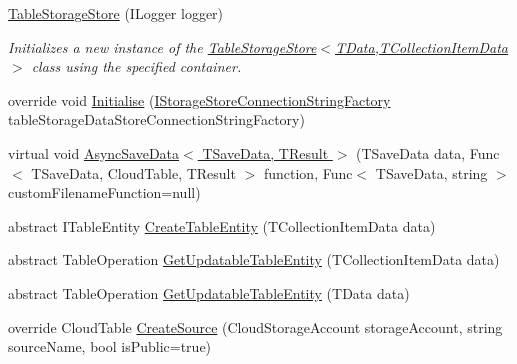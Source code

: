 \begin{DoxyCompactItemize}
\item 
\hyperlink{classCqrs_1_1Azure_1_1BlobStorage_1_1TableStorageStore_aabc36bc46ffb22b716cc7769a641cfab_aabc36bc46ffb22b716cc7769a641cfab}{Table\+Storage\+Store} (I\+Logger logger)
\begin{DoxyCompactList}\small\item\em Initializes a new instance of the \hyperlink{classCqrs_1_1Azure_1_1BlobStorage_1_1TableStorageStore_aabc36bc46ffb22b716cc7769a641cfab_aabc36bc46ffb22b716cc7769a641cfab}{Table\+Storage\+Store$<$\+T\+Data,\+T\+Collection\+Item\+Data$>$} class using the specified container. \end{DoxyCompactList}\item 
override void \hyperlink{classCqrs_1_1Azure_1_1BlobStorage_1_1TableStorageStore_ae775f039a168cc48c731314c7e494bb6_ae775f039a168cc48c731314c7e494bb6}{Initialise} (\hyperlink{interfaceCqrs_1_1Azure_1_1BlobStorage_1_1IStorageStoreConnectionStringFactory}{I\+Storage\+Store\+Connection\+String\+Factory} table\+Storage\+Data\+Store\+Connection\+String\+Factory)
\item 
virtual void \hyperlink{classCqrs_1_1Azure_1_1BlobStorage_1_1TableStorageStore_a1a1dcf73501d4e7fc23e8137627de6f7_a1a1dcf73501d4e7fc23e8137627de6f7}{Async\+Save\+Data$<$ T\+Save\+Data, T\+Result $>$} (T\+Save\+Data data, Func$<$ T\+Save\+Data, Cloud\+Table, T\+Result $>$ function, Func$<$ T\+Save\+Data, string $>$ custom\+Filename\+Function=null)
\item 
abstract I\+Table\+Entity \hyperlink{classCqrs_1_1Azure_1_1BlobStorage_1_1TableStorageStore_a168a634f7f55bd264e01bd7e0f1f9f15_a168a634f7f55bd264e01bd7e0f1f9f15}{Create\+Table\+Entity} (T\+Collection\+Item\+Data data)
\item 
abstract Table\+Operation \hyperlink{classCqrs_1_1Azure_1_1BlobStorage_1_1TableStorageStore_a1308b107766a375b7b8dcc92d9080393_a1308b107766a375b7b8dcc92d9080393}{Get\+Updatable\+Table\+Entity} (T\+Collection\+Item\+Data data)
\item 
abstract Table\+Operation \hyperlink{classCqrs_1_1Azure_1_1BlobStorage_1_1TableStorageStore_ae476c94b77d9c602aef934bd8c1b20ea_ae476c94b77d9c602aef934bd8c1b20ea}{Get\+Updatable\+Table\+Entity} (T\+Data data)
\item 
override Cloud\+Table \hyperlink{classCqrs_1_1Azure_1_1BlobStorage_1_1TableStorageStore_ad504317a3b2c07172f50b8e7b8d0f78e_ad504317a3b2c07172f50b8e7b8d0f78e}{Create\+Source} (Cloud\+Storage\+Account storage\+Account, string source\+Name, bool is\+Public=true)

\end{DoxyCompactItemize}
